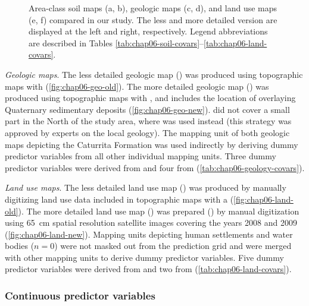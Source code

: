 \begin{figure}[!ht]
\begin{minipage}[b]{63mm}
 \end{minipage}
 \caption[Area-class soil maps, geologic maps, and land use maps compared in the study. ]{Area-class soil maps 
(a, b), geologic maps (c, d), and land use maps (e, f) compared in our study. The less and more detailed 
version are displayed at the left and right, respectively. Legend abbreviations are described in Tables 
\ref{tab:chap06-soil-covars}--\ref{tab:chap06-land-covars}.}
\label{fig:chap06-cat-covars}
\end{figure}

\noindent\textit{Geologic maps}. The less detailed geologic map (\geoOld) was produced using topographic maps 
with  \cite{GasparettoEtAl1988} (\autoref{fig:chap06-geo-old}). The more detailed geologic map 
(\geoNew) was produced using topographic maps with , and includes the location of overlaying 
Quaternary sedimentary deposits \cite{MacielFilho1990} (\autoref{fig:chap06-geo-new}). \geoNew{} did not cover 
a small part in the North of the study area, where \geoOld{} was used instead (this strategy was approved by 
experts on the local geology). The mapping unit of both geologic maps depicting the Caturrita Formation was 
used indirectly by deriving dummy predictor variables from all other individual mapping units. Three dummy 
predictor variables were derived from \geoOld{} and four from \geoNew{} (\autoref{tab:chap06-geology-covars}).

\noindent\textit{Land use maps}. The less detailed land use map (\landOld) was produced by manually digitizing 
land use data included in topographic maps with a  \cite{DSG1980, DSG1992, DSG1992a} 
(\autoref{fig:chap06-land-old}). The more detailed land use map (\landNew) was prepared () by 
manual digitization using \SI{65}{\cm} spatial resolution satellite images covering the years \num{2008} and 
\num{2009} \cite{SamuelRosaEtAl2011a} (\autoref{fig:chap06-land-new}). Mapping units depicting human 
settlements and water bodies ($n = 0$) were not masked out from the prediction grid and were merged with other 
mapping units to derive dummy predictor variables. Five dummy predictor variables were derived from \landNew{} 
and two from \landOld{} (\autoref{tab:chap06-land-covars}).

\subsubsection{Continuous predictor variables}
\label{subsubsec:chap06-continuous-covars}

